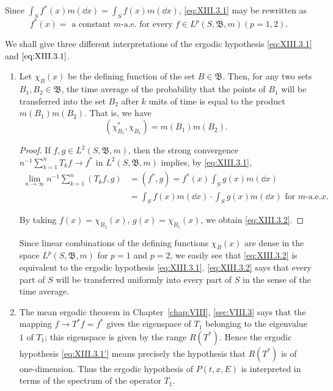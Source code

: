 Since $\int_{S} f^{*}(x) m(\dd x) = \int_{S} f(x) m(\dd x)$, \eqref{eq:XIII.3.1} may be rewritten as 
\begin{equation}\tag{1'}\label{eq:XIII.3.1'}
f ^{*} (x) = \text{ a constant } m \text{-a.e. for every } f \in L ^{p} (S, \mathfrak {B}, m) (p = 1, 2).
\end{equation}

We shall give three different interpretations of the ergodic hypothesis \eqref{eq:XIII.3.1} and $\eqref{eq:XIII.3.1}$. 

\begin{enumerate}[1.]
\item Let $\chi_B(x)$ be the defining function of the set $B \in \mathfrak{B}$. Then, for any two sets $B_1, B_2 \in \mathfrak{B}$, the time average of the probability that the points of $B_1$ will be transferred into the set $B_2$ after $k$ units of time is equal to the product $m(B_1)m(B_2)$. That is, we have 
\begin{equation}\label{eq:XIII.3.2}
\left(\chi_ {B _{1}} ^{*}, \chi_ {B _{1}}\right) = m \left(B _{1}\right) m \left(B _{2}\right).
\end{equation}

\begin{proof}
 If $f, g \in L^2(S, \mathfrak{B}, m)$, then the strong convergence $n^{-1} \sum\limits_{k=1}^{n} T_k f \to f^*$ in $L^2(S, \mathfrak{B}, m)$ implies, by \eqref{eq:XIII.3.1}, 
\[ \begin{aligned}\lim\limits _{n \rightarrow \infty} n ^{-1} \sum\limits_{k=1} ^{n} (T _{k} f, g)&= (f ^{*}, g) = f ^{*} (x) \int_{S} g (x) m (\dd x)\\&= \int_{S} f (x) m (\dd x) \cdot \int_{S} g (x) m (\dd x) \text{ for } m\text{-a.e.} x.\end{aligned}
\]

By taking $f(x) = \chi_{B_2}(x)$, $g(x) = \chi_{B_1}(x)$, we obtain \eqref{eq:XIII.3.2}. 
\end{proof}

\begin{remarku} Since linear combinations of the defining functions $\chi_{B}(x)$ are dense in the space $L^{p}(S, \mathfrak{B}, m)$ for $p = 1$ and $p = 2$, we easily see that \eqref{eq:XIII.3.2} is equivalent to the ergodic hypothesis \eqref{eq:XIII.3.1}. \eqref{eq:XIII.3.2} says that every part of $S$ will be transferred uniformly into every part of $S$ in the sense of the time average. 
\end{remarku}

\item The mean ergodic theorem in Chapter~\ref{chap:VIII}, \ref{sec:VIII.3} says that the mapping $f \to T^*f = f^*$ gives the eigenspace of $T_1$ belonging to the eigenvalue $1$ of $T_1$; this eigenspace is given by the range $R(T^*)$. Hence the ergodic hypothesis \eqref{eq:XIII.3.1'} means precisely the hypothesis that $R(T^*)$ is of one-dimension. Thus the ergodic hypothesis of $P(t,x,E)$ is interpreted in terms of the spectrum of the operator $T_1$. 


\end{enumerate}
